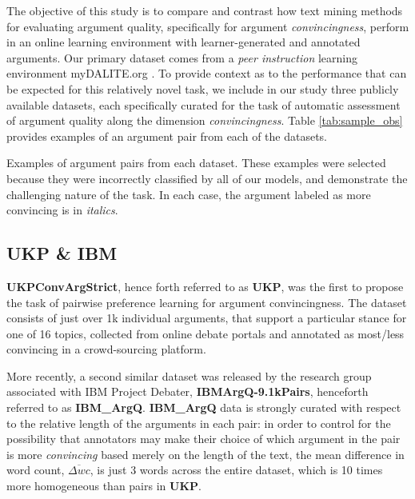 \documentclass[runningheads]{llncs}
\begin{document}
The objective of this study is to compare and contrast how text 
mining methods for evaluating argument quality, specifically for argument 
\textit{convincingness}, perform in an online learning environment with 
learner-generated and annotated arguments. 
Our primary dataset comes from a \textit{peer instruction} learning 
environment myDALITE.org . 
To provide context as to the performance that can be expected for this 
relatively novel task, we include in our study three publicly available 
datasets, each specifically curated for the task of automatic assessment of 
argument quality along the dimension \textit{convincingness}. 
Table \ref{tab:sample_obs} provides examples of an argument pair 
from each of the datasets.


\begin{table}
	\caption{Examples of argument pairs from each dataset. These examples were 
	selected because they were incorrectly classified by all of our models, and 
	demonstrate the challenging nature of the task. In each case, the argument 
	labeled as more convincing is in \textit{italics}.}
	\label{tab:sample_obs}
	\begin{subtable}[t]{\textwidth}
	
	\end{subtable}
	\begin{subtable}[t]{\textwidth}
	
	\end{subtable}
	\begin{subtable}[t]{\textwidth}
	
	\end{subtable}
\end{table}



\subsection{UKP \& IBM}
\textbf{UKPConvArgStrict}\cite{habernal_which_2016}, hence forth referred to as 
\textbf{UKP}, was the first to propose the task of pairwise preference learning 
for argument convincingness. 
The dataset consists of just over 1k individual arguments, that support a 
particular stance for one of 16 topics, collected from online debate portals 
and annotated as most/less convincing in a crowd-sourcing platform.  

More recently, a second similar dataset was released by the research group 
associated with IBM Project Debater, 
\textbf{IBMArgQ-9.1kPairs}\cite{toledo_automatic_2019}, henceforth 
referred to as \textbf{IBM\_ArgQ}.
\textbf{IBM\_ArgQ} data is strongly curated with respect to the relative length 
of the arguments in each pair: in order to control for the possibility that 
annotators may make their choice of which argument in the pair is more 
\textit{convincing} based merely on the length of the text, the mean difference 
in word count, $\overline{\Delta wc}$, is just 3 words across the entire 
dataset, which is 10 times more homogeneous than pairs in \textbf{UKP}.
\end{document}

